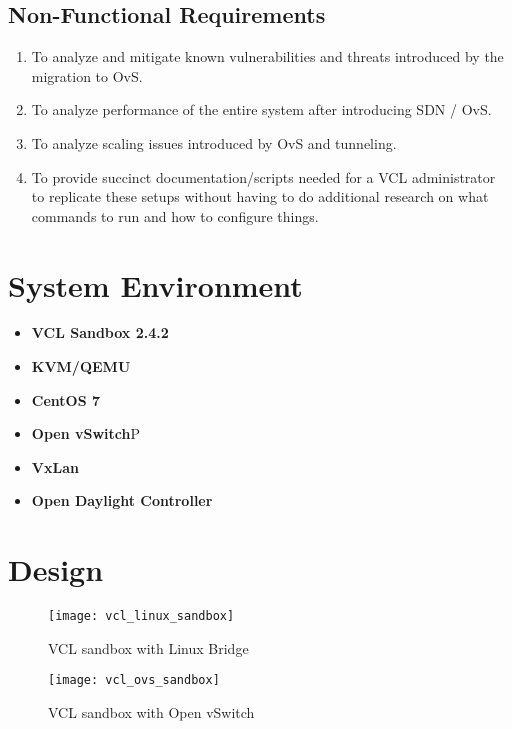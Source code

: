 \documentclass{article}
\begin{document}
\subsection{Non-Functional Requirements}
    \begin{enumerate}
        \item To analyze and mitigate known vulnerabilities and threats introduced by the migration to OvS.
        \item To analyze performance of the entire system after introducing SDN / OvS.
        \item To analyze scaling issues introduced by OvS and tunneling.
        \item To provide succinct documentation/scripts needed for a VCL administrator to replicate these setups without having to do additional research on what commands to run and how to configure things. 
    
    \end{enumerate}
    
\section{System Environment}
\begin{itemize}
    \item \textbf{VCL Sandbox 2.4.2}
    \item \textbf{KVM/QEMU}
    \item \textbf{CentOS 7}
    \item \textbf{Open vSwitch}P
    \item \textbf{VxLan}
    \item \textbf{Open Daylight Controller}
\end{itemize}


\section{Design}

\begin{figure}[H]
\centering
\texttt{[image: vcl\_linux\_sandbox]}
\caption{VCL sandbox with Linux Bridge}
\label{fig:allvsi}
\end{figure}

\begin{figure}[H]
\centering
\texttt{[image: vcl\_ovs\_sandbox]}
\caption{VCL sandbox with Open vSwitch}
\label{fig:allvsi}
\end{figure}
\end{document}
